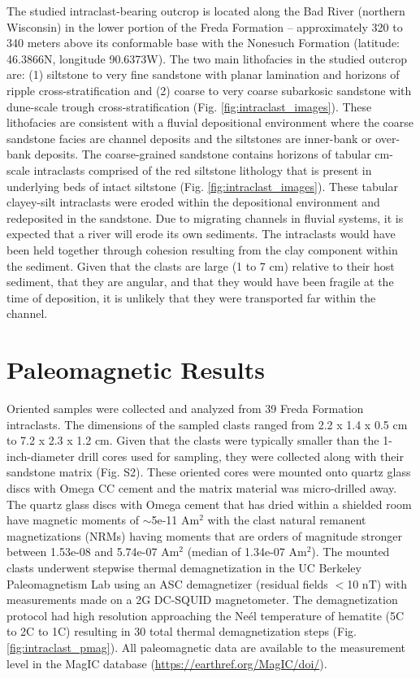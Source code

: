 \documentclass[draft]{agujournal2018}
\begin{document}
The studied intraclast-bearing outcrop is located along the Bad River (northern Wisconsin) in the lower portion of the Freda Formation -- approximately 320 to 340 meters above its conformable base with the Nonesuch Formation (latitude:  46.3866\textdegree N, longitude 90.6373\textdegree W). The two main lithofacies in the studied outcrop are: (1) siltstone to very fine sandstone with planar lamination and horizons of ripple cross-stratification and (2) coarse to very coarse subarkosic sandstone with dune-scale trough cross-stratification (Fig. \ref{fig:intraclast_images}). These lithofacies are consistent with a fluvial depositional environment where the coarse sandstone facies are channel deposits and the siltstones are inner-bank or over-bank deposits. The coarse-grained sandstone contains horizons of tabular cm-scale intraclasts comprised of the red siltstone lithology that is present in underlying beds of intact siltstone (Fig. \ref{fig:intraclast_images}). These tabular clayey-silt intraclasts were eroded within the depositional environment and redeposited in the sandstone. Due to migrating channels in fluvial systems, it is expected that a river will erode its own sediments. The intraclasts would have been held together through cohesion resulting from the clay component within the sediment. Given that the clasts are large (1 to 7 cm) relative to their host sediment, that they are angular, and that they would have been fragile at the time of deposition, it is unlikely that they were transported far within the channel.

\section*{Paleomagnetic Results}

Oriented samples were collected and analyzed from 39 Freda Formation intraclasts. The dimensions of the sampled clasts ranged from 2.2 x 1.4 x 0.5 cm to 7.2 x 2.3 x 1.2 cm. Given that the clasts were typically smaller than the 1-inch-diameter drill cores used for sampling, they were collected along with their sandstone matrix (Fig. S2). These oriented cores were mounted onto quartz glass discs with Omega CC cement and the matrix material was micro-drilled away. The quartz glass discs with Omega cement that has dried within a shielded room have magnetic moments of $\sim$5e-11 Am$^2$ with the clast natural remanent magnetizations (NRMs) having moments that are orders of magnitude stronger between 1.53e-08 and 5.74e-07 Am$^2$ (median of 1.34e-07 Am$^2$). The mounted clasts underwent stepwise thermal demagnetization in the UC Berkeley Paleomagnetism Lab using an ASC demagnetizer (residual fields $<$10 nT) with measurements made on a 2G DC-SQUID magnetometer. The demagnetization protocol had high resolution  approaching the Ne\'el temperature of hematite (5\textdegree C to 2\textdegree C to 1\textdegree C) resulting in 30 total thermal demagnetization steps (Fig. \ref{fig:intraclast_pmag}). All paleomagnetic data are available to the measurement level in the MagIC database (\url{https://earthref.org/MagIC/doi/}).
\end{document}
